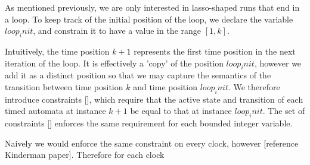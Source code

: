 \documentclass[a4paper,11pt]{article}
\begin{document}
As mentioned previously, we are only interested in lasso-shaped runs that end in
a loop. To keep track of the initial position of the loop, we declare the
variable \(loop_init\), and constrain it to have a value in the range \([1,k]\).

Intuitively, the time position \(k+1\) represents the first time position in the
next iteration of the loop. It is effectively a 'copy' of the position
\(loop_init\), however we add it as a distinct position so that we may capture
the semantics of the transition between time position \(k\) and time position
\(loop_init\). We therefore introduce constraints [], which require that the
active state and transition of each timed automata at instance \(k+1\) be equal
to that at instance \(loop_init\). The set of constraints [] enforces the same
requirement for each bounded integer variable.

Naively we would enforce the same constraint on every clock, however [reference
Kinderman paper]. Therefore for each clock
\end{document}

